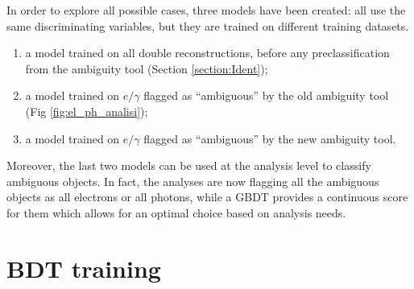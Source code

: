 \documentclass[a4paper, oneside, 11pt, openright]{book}
\begin{document}
		In order to explore all possible cases, three models have been created: all use the same discriminating variables, but they are trained on different training datasets.
		\begin{enumerate}
			\item a model trained on all double reconstructions, before any preclassification from the ambiguity tool (Section \ref{section:Ident});
			\item a model trained on $e/\gamma$ flagged as “ambiguous” by the old ambiguity tool (Fig \ref{fig:el_ph_analisi});
			\item a model trained on $e/\gamma$ flagged as “ambiguous” by the new ambiguity tool.
		\end{enumerate}
		Moreover, the last two models can be used at the analysis level to classify ambiguous objects. In fact, the analyses are now flagging all the ambiguous objects as all electrons or all photons, while a GBDT provides a continuous score for them which allows for an optimal choice based on analysis needs.
			
		\section{BDT training}
\end{document}
